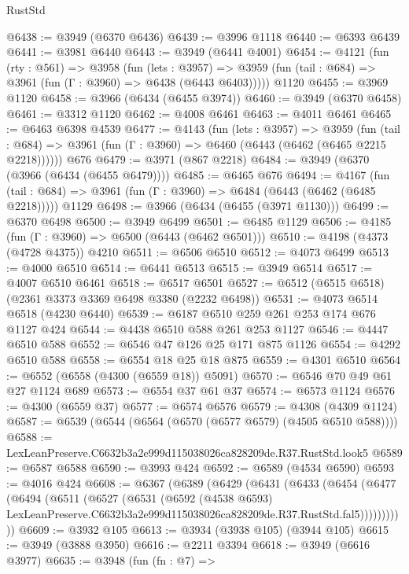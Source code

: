 \begin{lexlean}{RustStd}
\begin{coremodule}
@6438 := @3949 (@6370 @6436)
@6439 := @3996 @1118
@6440 := @6393 @6439
@6441 := @3981 @6440
@6443 := @3949 (@6441 @4001)
@6454 := @4121
    (fun (rty : @561) =>
    @3958
      (fun (lets : @3957) =>
      @3959 (fun (tail : @684) => @3961 (fun (Γ : @3960) => @6438 (@6443 @6403)))))
    @1120
@6455 := @3969 @1120
@6458 := @3966 (@6434 (@6455 @3974))
@6460 := @3949 (@6370 @6458)
@6461 := @3312 @1120
@6462 := @4008 @6461
@6463 := @4011 @6461
@6465 := @6463 @6398 @4539
@6477 := @4143
    (fun (lets : @3957) =>
    @3959
      (fun (tail : @684) => @3961 (fun (Γ : @3960) => @6460 (@6443 (@6462 (@6465 @2215 @2218))))))
    @676
@6479 := @3971 (@867 @2218)
@6484 := @3949 (@6370 (@3966 (@6434 (@6455 @6479))))
@6485 := @6465 @676
@6494 := @4167
    (fun (tail : @684) => @3961 (fun (Γ : @3960) => @6484 (@6443 (@6462 (@6485 @2218)))))
    @1129
@6498 := @3966 (@6434 (@6455 (@3971 @1130)))
@6499 := @6370 @6498
@6500 := @3949 @6499
@6501 := @6485 @1129
@6506 := @4185 (fun (Γ : @3960) => @6500 (@6443 (@6462 @6501)))
@6510 := @4198 (@4373 (@4728 @4375)) @4210
@6511 := @6506 @6510
@6512 := @4073 @6499
@6513 := @4000 @6510
@6514 := @6441 @6513
@6515 := @3949 @6514
@6517 := @4007 @6510 @6461
@6518 := @6517 @6501
@6527 := @6512 (@6515 @6518) (@2361 @3373 @3369 @6498 @3380 (@2232 @6498))
@6531 := @4073 @6514 @6518 (@4230 @6440)
@6539 := @6187 @6510 @259 @261 @253 @174 @676 @1127 @424
@6544 := @4438 @6510 @588 @261 @253 @1127
@6546 := @4447 @6510 @588
@6552 := @6546 @47 @126 @25 @171 @875 @1126
@6554 := @4292 @6510 @588
@6558 := @6554 @18 @25 @18 @875
@6559 := @4301 @6510
@6564 := @6552 (@6558 (@4300 (@6559 @18)) @5091)
@6570 := @6546 @70 @49 @61 @27 @1124 @689
@6573 := @6554 @37 @61 @37
@6574 := @6573 @1124
@6576 := @4300 (@6559 @37)
@6577 := @6574 @6576
@6579 := @4308 (@4309 @1124)
@6587 := @6539 (@6544 (@6564 (@6570 (@6577 @6579) (@4505 @6510 @588))))
@6588 := LexLeanPreserve.C6632b3a2e999d115038026ca828209de.R37.RustStd.look5
@6589 := @6587 @6588
@6590 := @3993 @424
@6592 := @6589 (@4534 @6590)
@6593 := @4016 @424
@6608 := @6367
    (@6389
      (@6429
        (@6431
          (@6433
            (@6454
              (@6477
                (@6494
                  (@6511
                    (@6527
                      (@6531
                        (@6592
                          (@4538 @6593)
                          LexLeanPreserve.C6632b3a2e999d115038026ca828209de.R37.RustStd.fal5)))))))))))
@6609 := @3932 @105
@6613 := @3934 (@3938 @105) (@3944 @105)
@6615 := @3949 (@3888 @3950)
@6616 := @2211 @3394
@6618 := @3949 (@6616 @3977)
@6635 := @3948
    (fun (fn : @7) =>

\end{coremodule}
\end{lexlean}
